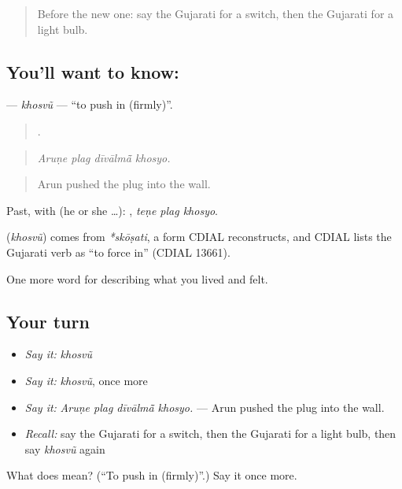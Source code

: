 \label{lesson:GU-C517-khosvu}



\begin{quote}
Before the new one: say the Gujarati for a switch, then the Gujarati for a light bulb.
\end{quote}

\subsection*{You'll want to know: }
\textbf{} — \emph{khosvũ} — \textquotedblleft{}to push in (firmly)\textquotedblright{}.

\begin{quote}
   .
\end{quote}

\begin{quote}
\emph{Aruṇe plag dīvālmā̃ khosyo.}
\end{quote}

\begin{quote}
Arun pushed the plug into the wall.
\end{quote}

Past, with  (he or she …):   , \emph{teṇe plag khosyo}.

\begin{cousinweb}
\textbf{} (\emph{khosvũ}) comes from \emph{*skōṣati}, a form CDIAL reconstructs, and CDIAL lists the Gujarati verb as \textquotedblleft{}to force in\textquotedblright{} (CDIAL 13661).
\end{cousinweb}

\begin{grammarlens}[title={What you've built}]
One more word for describing what you lived and felt.
\end{grammarlens}

\subsection*{Your turn}
\begin{itemize}
\raggedright
  \item \emph{Say it:} \emph{khosvũ}
  \item \emph{Say it:} \emph{khosvũ}, once more
  \item \emph{Say it:} \emph{Aruṇe plag dīvālmā̃ khosyo.} — Arun pushed the plug into the wall.
  \item \emph{Recall:} say the Gujarati for a switch, then the Gujarati for a light bulb, then say \emph{khosvũ} again
\end{itemize}

\begin{tcolorbox}[breakable,colback=teal!4,colframe=teal!35!black,title={Before you move on}]
What does  mean? (\textquotedblleft{}To push in (firmly)\textquotedblright{}.) Say it once more.
\end{tcolorbox}
